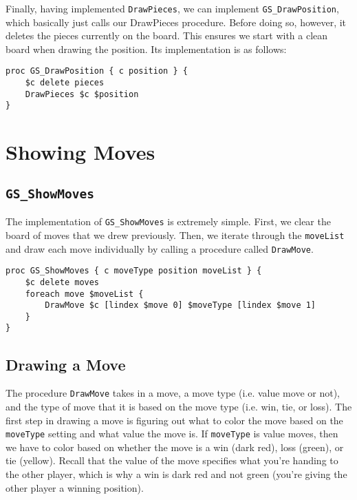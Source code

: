 \documentclass{article}
\begin{document}
Finally, having implemented \texttt{DrawPieces}, we can implement \texttt{GS\_DrawPosition}, which basically just calls our DrawPieces procedure. Before doing so, however, it deletes the pieces currently on the board. This ensures we start with a clean board when drawing the position. Its implementation is as follows:

\begin{verbatim}
proc GS_DrawPosition { c position } {
    $c delete pieces
    DrawPieces $c $position
}
\end{verbatim}


\section{Showing Moves}

\subsection{\texttt{GS\_ShowMoves}}

The implementation of \texttt{GS\_ShowMoves} is extremely simple. First, we clear the board of moves that we drew previously. Then, we iterate through the \texttt{moveList} and draw each move individually by calling a procedure called \texttt{DrawMove}.

\begin{verbatim}
proc GS_ShowMoves { c moveType position moveList } {
    $c delete moves
    foreach move $moveList {
        DrawMove $c [lindex $move 0] $moveType [lindex $move 1]
    }
}
\end{verbatim}

\subsection{Drawing a Move}

The procedure \texttt{DrawMove} takes in a move, a move type (i.e. value move or not), and the type of move that it is based on the move type (i.e. win, tie, or loss). The first step in drawing a move is figuring out what to color the move based on the \texttt{moveType} setting and what value the move is. If \texttt{moveType} is value moves, then we have to color based on whether the move is a win (dark red), loss (green), or tie (yellow). Recall that the value of the move specifies what you're handing to the other player, which is why a win is dark red and not green (you're giving the other player a winning position).
\end{document}
